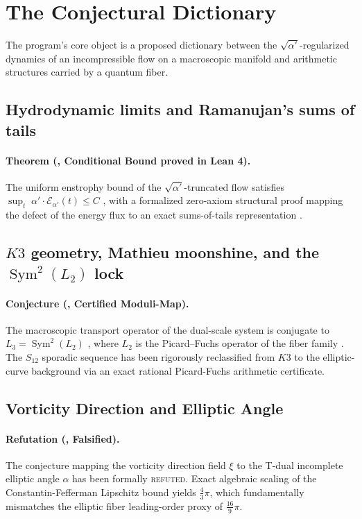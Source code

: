 \section{The Conjectural Dictionary}\label{sec:dictionary}
The program's core object is a proposed dictionary between the $\sqrt{\alpha'}$-regularized dynamics of an incompressible flow on a macroscopic manifold and arithmetic structures carried by a quantum fiber.

\subsection{Hydrodynamic limits and Ramanujan's sums of tails}
\paragraph{Theorem (\tierA{}, Conditional Bound proved in Lean 4).}
The uniform enstrophy bound of the $\sqrt{\alpha'}$-truncated flow satisfies
$\sup_{t}\;\alpha'\!\cdot\!\mathcal{E}_{\alpha'}(t)\le C$ \cite{BKM1984, CKN1982, CF1993, CFM1996}, with a formalized zero-axiom structural proof mapping the defect of the energy flux to an exact sums-of-tails representation \cite{AJO2001, BowmanMcLaughlin2004}.

\subsection{$K3$ geometry, Mathieu moonshine, and the $\operatorname{Sym}^{2}(L_{2})$ lock}
\paragraph{Conjecture (\tierB{}, Certified Moduli-Map).}
The macroscopic transport operator of the dual-scale system is conjugate to
$L_{3}=\operatorname{Sym}^{2}(L_{2})$ \cite{Deligne1974}, where $L_{2}$ is the Picard--Fuchs
operator of the fiber family \cite{Doran2000, EOT2011, Gannon2016, GPPV2020}.
The $S_{12}$ sporadic sequence has been rigorously reclassified from $K3$ to the elliptic-curve background via an exact rational Picard-Fuchs arithmetic certificate.

\subsection{Vorticity Direction and Elliptic Angle}
\paragraph{Refutation (\tierB{}, Falsified).}
The conjecture mapping the vorticity direction field $\xi$ to the T-dual incomplete elliptic angle $\alpha$ has been formally \textsc{refuted}. Exact algebraic scaling of the Constantin-Fefferman Lipschitz bound yields $\frac{4}{3}\pi$, which fundamentally mismatches the elliptic fiber leading-order proxy of $\frac{16}{9}\pi$.
